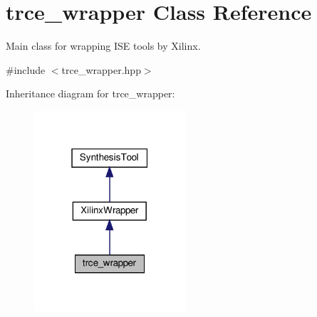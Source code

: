 \hypertarget{classtrce__wrapper}{}\section{trce\+\_\+wrapper Class Reference}
\label{classtrce__wrapper}


Main class for wrapping I\+SE tools by Xilinx.  




{\ttfamily \#include $<$trce\+\_\+wrapper.\+hpp$>$}



Inheritance diagram for trce\+\_\+wrapper\+:
\nopagebreak
\begin{figure}[H]
\begin{center}
\leavevmode
\includegraphics[width=159pt]{d0/d2a/classtrce__wrapper__inherit__graph}
\end{center}
\end{figure}


